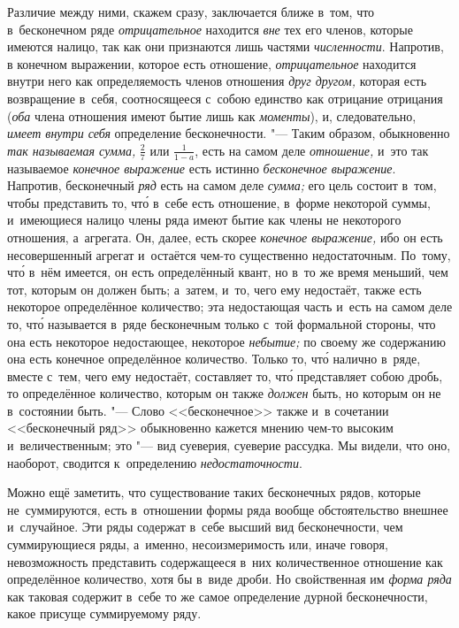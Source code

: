 Различие между ними, скажем сразу, заключается ближе в~том, что в~бесконечном
ряде {\em отрицательное} находится {\em вне} тех его членов, которые имеются
налицо, так как они признаются лишь частями {\em численности}. Напротив, в
конечном выражении, которое есть отношение, {\em отрицательное} находится
внутри него как определяемость членов отношения {\em друг другом,} которая есть
возвращение в~себя, соотносящееся с~собою единство как отрицание отрицания
({\em оба} члена отношения имеют бытие лишь как {\em моменты}), и,
следовательно, {\em имеет внутри себя} определение бесконечности. "--- Таким
образом, обыкновенно {\em так называемая сумма,} $\frac 2 7$ или
$\frac 1{1-a}$, есть на самом деле {\em отношение,} и~это так называемое
{\em конечное выражение} есть истинно {\em бесконечное выражение}. Напротив,
бесконечный {\em ряд} есть на самом деле {\em сумма;} его цель состоит в~том,
чтобы представить то, чт\'{о} в~себе есть отношение, в~форме некоторой суммы,
и~имеющиеся налицо члены ряда имеют бытие как члены не некоторого отношения,
а~агрегата. Он, далее, есть скорее {\em конечное выражение,} ибо он есть
несовершенный агрегат и~остаётся чем-то существенно недостаточным. По~тому,
чт\'{о} в~нём имеется, он есть определённый квант, но в~то же время
меньший, чем тот, которым он должен быть; а~затем,
и~то, чего ему недостаёт, также есть некоторое определённое количество; эта
недостающая часть и~есть на самом деле то, чт\'{о} называется в~ряде
бесконечным только с~той формальной стороны, что она есть некоторое
недостающее, некоторое {\em небытие;} по своему же содержанию она есть конечное
определённое количество. Только то, чт\'{о} налично в~ряде, вместе с~тем, чего
ему недостаёт, составляет то, чт\'{о} представляет собою дробь, то определённое
количество, которым он также {\em должен} быть, но которым он не в~состоянии
быть. "--- Слово <<бесконечное>> также и~в сочетании <<бесконечный ряд>>
обыкновенно кажется мнению чем-то высоким и~величественным; это "--- вид
суеверия, суеверие рассудка. Мы видели, что оно, наоборот, сводится
к~определению {\em недостаточности}.

Можно ещё заметить, что существование таких бесконечных рядов, которые
не~суммируются, есть в~отношении формы ряда вообще обстоятельство внешнее
и~случайное. Эти ряды содержат в~себе высший вид бесконечности, чем
суммирующиеся ряды, а~именно, несоизмеримость или, иначе говоря, невозможность
представить содержащееся в~них количественное отношение как
определённое количество, хотя бы в~виде дроби. Но свойственная им
{\em форма ряда} как таковая содержит в~себе то же самое определение дурной
бесконечности, какое присуще суммируемому ряду.

